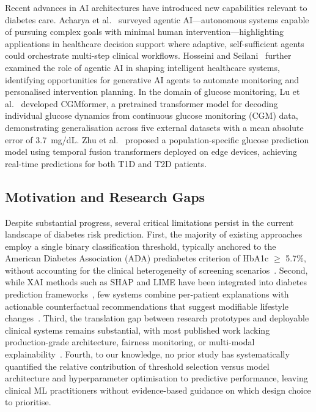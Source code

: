 \documentclass[conference]{IEEEtran}
\begin{document}
Recent advances in AI architectures have introduced new capabilities relevant to diabetes care. Acharya et al.~\cite{b15} surveyed agentic AI---autonomous systems capable of pursuing complex goals with minimal human intervention---highlighting applications in healthcare decision support where adaptive, self-sufficient agents could orchestrate multi-step clinical workflows. Hosseini and Seilani~\cite{b16} further examined the role of agentic AI in shaping intelligent healthcare systems, identifying opportunities for generative AI agents to automate monitoring and personalised intervention planning. In the domain of glucose monitoring, Lu et al.~\cite{b17} developed CGMformer, a pretrained transformer model for decoding individual glucose dynamics from continuous glucose monitoring (CGM) data, demonstrating generalisation across five external datasets with a mean absolute error of 3.7~mg/dL. Zhu et al.~\cite{b18} proposed a population-specific glucose prediction model using temporal fusion transformers deployed on edge devices, achieving real-time predictions for both T1D and T2D patients.

\subsection{Motivation and Research Gaps}

Despite substantial progress, several critical limitations persist in the current landscape of diabetes risk prediction. First, the majority of existing approaches employ a single binary classification threshold, typically anchored to the American Diabetes Association (ADA) prediabetes criterion of HbA1c $\geq$ 5.7\%, without accounting for the clinical heterogeneity of screening scenarios~\cite{b4, b6}. Second, while XAI methods such as SHAP and LIME have been integrated into diabetes prediction frameworks~\cite{b5, b9, b12}, few systems combine per-patient explanations with actionable counterfactual recommendations that suggest modifiable lifestyle changes~\cite{b10, b11}. Third, the translation gap between research prototypes and deployable clinical systems remains substantial, with most published work lacking production-grade architecture, fairness monitoring, or multi-modal explainability~\cite{b8, b13, b15}. Fourth, to our knowledge, no prior study has systematically quantified the relative contribution of threshold selection versus model architecture and hyperparameter optimisation to predictive performance, leaving clinical ML practitioners without evidence-based guidance on which design choice to prioritise.
\end{document}
